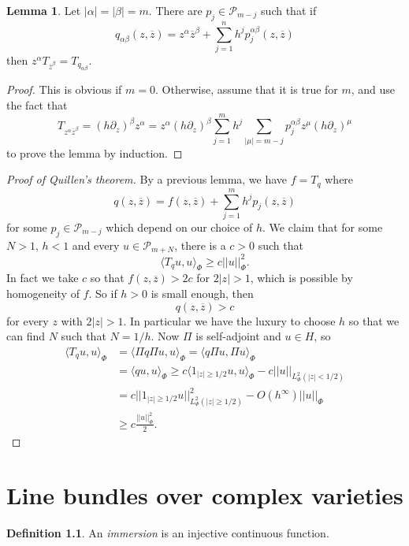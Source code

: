 \documentclass[12pt]{report}
\newcommand{\dfn}[1]{\emph{#1}\index{#1}}
\theoremstyle{definition}
\newtheorem{lemma}[theorem]{Lemma}
\newtheorem{definition}[theorem]{Definition}
\begin{document}
\begin{lemma}
    Let $|\alpha| = |\beta| = m$. There are $p_j \in \mathcal P_{m - j}$ such that if
    $$q_{\alpha\beta}(z, \overline z) = z^\alpha \overline z^\beta + \sum_{j=1}^n h^j p_j^{\alpha\beta}(z, \overline z)$$
    then $z^\alpha T_{\overline z^\beta} = T_{q_{\alpha\beta}}$.
\end{lemma}
\begin{proof}
    This is obvious if $m = 0$. Otherwise, assume that it is true for $m$, and use the fact that
    $$T_{z^\alpha \overline z^\beta} = (h \partial_z)^\beta z^\alpha = z^\alpha(h\partial_z)^\beta \sum_{j=1}^m h^j \sum_{|\mu|=m-j} p_j^{\alpha\beta} z^\mu (h\partial_z)^\mu$$
    to prove the lemma by induction.
\end{proof}
\begin{proof}[Proof of Quillen's theorem]
    By a previous lemma, we have $f = T_q$ where
    $$q(z, \overline z) = f(z, \overline z) + \sum_{j=1}^m h^j p_j(z, \overline z)$$
    for some $p_j \in \mathcal P_{m - j}$ which depend on our choice of $h$. We claim that for some $N > 1$, $h < 1$ and every $u \in \mathcal P_{m + N}$, there is a $c > 0$ such that
    $$\langle T_qu, u\rangle_\Phi \geq c||u||^2_\Phi.$$
    In fact we take $c$ so that $f(z, \overline z) > 2c$ for $2|z| > 1$, which is possible by homogeneity of $f$. So if $h > 0$ is small enough, then
    $$q(z, \overline z) > c$$
    for every $z$ with $2|z| > 1$. In particular we have the luxury to choose $h$ so that we can find $N$ such that $N = 1/h$. Now $\Pi$ is self-adjoint and $u \in H$, so
\begin{align*}
    \langle T_qu, u\rangle_\Phi &= \langle \Pi q\Pi u, u\rangle_\Phi = \langle q\Pi u, \Pi u\rangle_\Phi \\
    &= \langle qu, u\rangle_\Phi \geq c\langle 1_{|z| \geq 1/2}u, u\rangle_\Phi - c||u||_{L^2_\Phi(|z| < 1/2)}\\
    &= c||1_{|z| \geq 1/2} u||_{L^2_\Phi(|z| \geq 1/2)}^2 - O(h^\infty)||u||_\Phi\\
    &\geq c\frac{||u||_\Phi^2}{2}.
\end{align*}
\end{proof}

\chapter{Line bundles over complex varieties}
\begin{definition}
    An \dfn{immersion} is an injective continuous function.
\end{definition}
\end{document}
